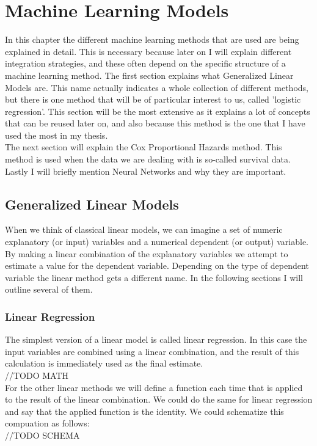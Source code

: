 \chapter{Machine Learning Models}
\label{cha:1}
In this chapter the different machine learning methods that are used are being explained in detail. This is necessary because later on I will explain different integration strategies, and these often depend on the specific structure of a machine learning method. The first section explains what Generalized Linear Models are. This name actually indicates a whole collection of different methods, but there is one method that will be of particular interest to us, called 'logistic regression'. This section will be the most extensive as it explains a lot of concepts that can be reused later on, and also because this method is the one that I have used the most in my thesis. \\
The next section will explain the Cox Proportional Hazards method. This method is used when the data we are dealing with is so-called survival data. \\
Lastly I will briefly mention Neural Networks and why they are important.

\section{Generalized Linear Models}
When we think of classical linear models, we can imagine a set of numeric explanatory (or input) variables and a numerical dependent (or output) variable. By making a linear combination of the explanatory variables we attempt to estimate a value for the dependent variable. Depending on the type of dependent variable the linear method gets a different name. In the following sections I will outline several of them.

\subsection{Linear Regression}
The simplest version of a linear model is called linear regression. In this case the input variables are combined using a linear combination, and the result of this calculation is immediately used as the final estimate. \\
//TODO MATH \\
For the other linear methods we will define a function each time that is applied to the result of the linear combination. We could do the same for linear regression and say that the applied function is the identity. We could schematize this compuation as follows: \\
//TODO SCHEMA \\
